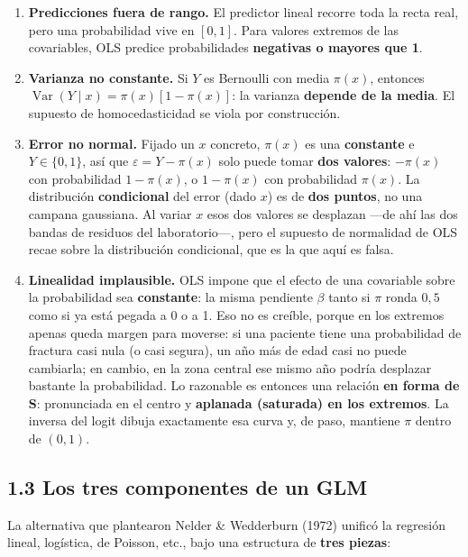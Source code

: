 \documentclass[
  letterpaper,
  DIV=11,
  numbers=noendperiod]{scrartcl}
\providecommand{\tightlist}{%
  \setlength{\itemsep}{0pt}\setlength{\parskip}{0pt}}\usepackage{longtable,booktabs,array}
\begin{document}
\begin{enumerate}
\def\labelenumi{\arabic{enumi}.}
\tightlist
\item
  \textbf{Predicciones fuera de rango.} El predictor lineal recorre toda
  la recta real, pero una probabilidad vive en \([0,1]\). Para valores
  extremos de las covariables, OLS predice probabilidades
  \textbf{negativas o mayores que 1}.
\item
  \textbf{Varianza no constante.} Si \(Y\) es Bernoulli con media
  \(\pi(x)\), entonces \(\operatorname{Var}(Y\mid x)=\pi(x)[1-\pi(x)]\):
  la varianza \textbf{depende de la media}. El supuesto de
  homocedasticidad se viola por construcción.
\item
  \textbf{Error no normal.} Fijado un \(x\) concreto, \(\pi(x)\) es una
  \textbf{constante} e \(Y\in\{0,1\}\), así que \(\varepsilon=Y-\pi(x)\)
  solo puede tomar \textbf{dos valores}: \(-\pi(x)\) con probabilidad
  \(1-\pi(x)\), o \(1-\pi(x)\) con probabilidad \(\pi(x)\). La
  distribución \textbf{condicional} del error (dado \(x\)) es de
  \textbf{dos puntos}, no una campana gaussiana. Al variar \(x\) esos
  dos valores se desplazan ---de ahí las dos bandas de residuos del
  laboratorio---, pero el supuesto de normalidad de OLS recae sobre la
  distribución condicional, que es la que aquí es falsa.
\item
  \textbf{Linealidad implausible.} OLS impone que el efecto de una
  covariable sobre la probabilidad sea \textbf{constante}: la misma
  pendiente \(\beta\) tanto si \(\pi\) ronda \(0{,}5\) como si ya está
  pegada a 0 o a 1. Eso no es creíble, porque en los extremos apenas
  queda margen para moverse: si una paciente tiene una probabilidad de
  fractura casi nula (o casi segura), un año más de edad casi no puede
  cambiarla; en cambio, en la zona central ese mismo año podría
  desplazar bastante la probabilidad. Lo razonable es entonces una
  relación \textbf{en forma de S}: pronunciada en el centro y
  \textbf{aplanada (saturada) en los extremos}. La inversa del logit
  dibuja exactamente esa curva y, de paso, mantiene \(\pi\) dentro de
  \((0,1)\).
\end{enumerate}

\hypertarget{sec-u11-tres-componentes}{%
\subsection{1.3 Los tres componentes de un
GLM}\label{sec-u11-tres-componentes}}

La alternativa que plantearon Nelder \& Wedderburn (1972) unificó la
regresión lineal, logística, de Poisson, etc., bajo una estructura de
\textbf{tres piezas}:
\end{document}
